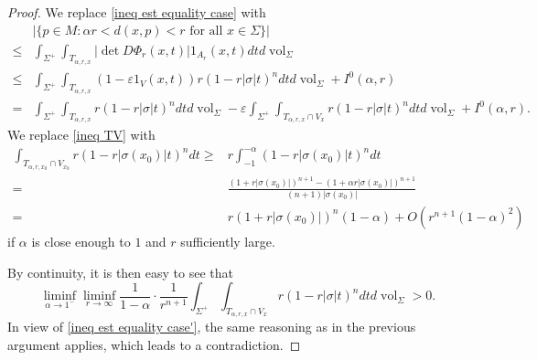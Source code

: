 \documentclass[10pt,a4paper]{amsart}
\begin{document}
\begin{proof}
We replace \eqref{ineq est equality case} with
\begin{equation}\label{ineq est equality case'}
\begin{aligned}
& | \{p \in M: \alpha r<d(x, p)<r \text { for all } x \in \Sigma\} | \\
\le & \int_{\Sigma^{+}} \int_{T_{\alpha, r, x}} \left|\det D \Phi_r(x, t)\right| 1_{A_r}(x, t) d t d \operatorname{vol}_{\Sigma} \\
\le & \int_{\Sigma^{+}} \int_{T_{\alpha, r, x}} \left(1-\varepsilon 1_V(x, t)\right) r(1-r|\sigma| t)^n d t d \operatorname{vol}_{\Sigma}+I^0(\alpha, r)\\
=& \int_{\Sigma^{+}} \int_{T_{\alpha, r, x}} r(1-r|\sigma| t)^n d t d \operatorname{vol}_{\Sigma}
-\varepsilon\int_{\Sigma^{+}} \int_{T_{\alpha, r, x}\cap V_x} r(1-r|\sigma| t)^n d t d \operatorname{vol}_{\Sigma}
+I^0(\alpha, r).
\end{aligned}
\end{equation}
We replace \eqref{ineq TV} with
\begin{equation*}
\begin{aligned}
\int_{T_{\alpha, r, x_0 }\cap V_{x_0}}r \left(1-r\left|\sigma\left(x_0\right)\right| t\right)^n d t
\ge& r \int_{-1}^{-\alpha}\left(1-r\left|\sigma\left(x_0\right)\right| t\right)^n d t\\
=& \frac{\left(1+r\left|\sigma\left(x_0\right)\right|\right)^{n+1}-\left(1+\alpha r\left|\sigma\left(x_0\right)\right|\right)^{n+1}}{(n+1)\left|\sigma\left(x_0\right)\right|}\\
=& {r\left(1+r\left|\sigma\left(x_0\right)\right|\right)^n}(1-\alpha)+O(r^{n+1}(1-\alpha)^2)
\end{aligned}
\end{equation*}
if $\alpha$ is close enough to $1$ and $r$ sufficiently large.

By continuity, it is then easy to see that
$$
\liminf_{\alpha \rightarrow 1^{-}} \liminf_{r \rightarrow \infty} \frac{1}{1-\alpha} \cdot \frac{1}{r^{n+1}}\int_{\Sigma^{+}} \int_{T_{\alpha, r, x}\cap V_x} r(1-r|\sigma| t)^n d t d \operatorname{vol}_{\Sigma}>0.
$$
In view of \eqref{ineq est equality case'}, the same reasoning as in the previous argument applies, which leads to a contradiction.
\end{proof}
\end{document}
